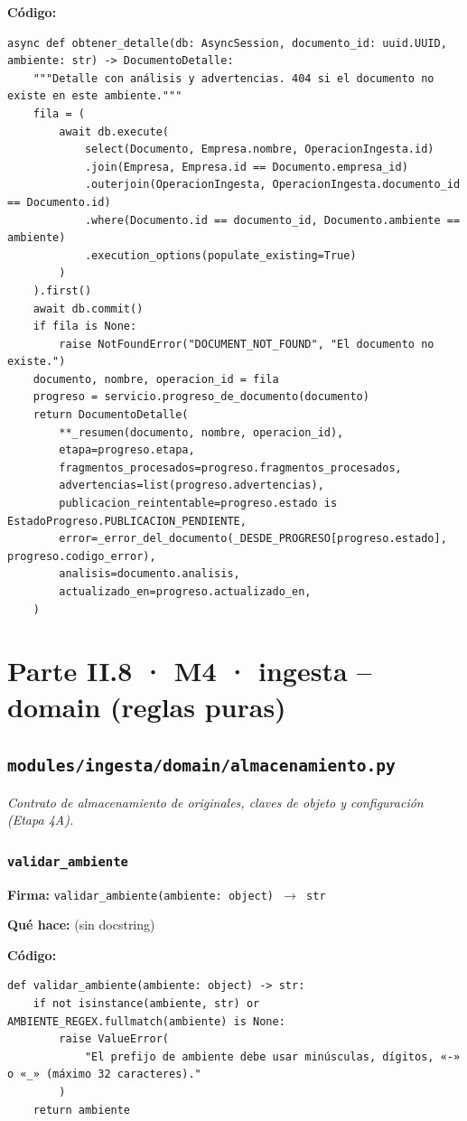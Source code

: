 \documentclass[11pt,a4paper]{article}
\begin{document}
\textbf{Código:}
\begin{lstlisting}
async def obtener_detalle(db: AsyncSession, documento_id: uuid.UUID, ambiente: str) -> DocumentoDetalle:
    """Detalle con análisis y advertencias. 404 si el documento no existe en este ambiente."""
    fila = (
        await db.execute(
            select(Documento, Empresa.nombre, OperacionIngesta.id)
            .join(Empresa, Empresa.id == Documento.empresa_id)
            .outerjoin(OperacionIngesta, OperacionIngesta.documento_id == Documento.id)
            .where(Documento.id == documento_id, Documento.ambiente == ambiente)
            .execution_options(populate_existing=True)
        )
    ).first()
    await db.commit()
    if fila is None:
        raise NotFoundError("DOCUMENT_NOT_FOUND", "El documento no existe.")
    documento, nombre, operacion_id = fila
    progreso = servicio.progreso_de_documento(documento)
    return DocumentoDetalle(
        **_resumen(documento, nombre, operacion_id),
        etapa=progreso.etapa,
        fragmentos_procesados=progreso.fragmentos_procesados,
        advertencias=list(progreso.advertencias),
        publicacion_reintentable=progreso.estado is EstadoProgreso.PUBLICACION_PENDIENTE,
        error=_error_del_documento(_DESDE_PROGRESO[progreso.estado], progreso.codigo_error),
        analisis=documento.analisis,
        actualizado_en=progreso.actualizado_en,
    )
\end{lstlisting}

\section{Parte II.8 · M4 · ingesta -- domain (reglas puras)}
\subsection{\texttt{modules/ingesta/domain/almacenamiento.py}}
\textit{Contrato de almacenamiento de originales, claves de objeto y configuración (Etapa 4A).}

\subsubsection*{\texttt{validar\_ambiente}}
\textbf{Firma:} \texttt{validar\_ambiente(ambiente: object) $\rightarrow$ str}

\textbf{Qué hace:} (sin docstring)

\textbf{Código:}
\begin{lstlisting}
def validar_ambiente(ambiente: object) -> str:
    if not isinstance(ambiente, str) or AMBIENTE_REGEX.fullmatch(ambiente) is None:
        raise ValueError(
            "El prefijo de ambiente debe usar minúsculas, dígitos, «-» o «_» (máximo 32 caracteres)."
        )
    return ambiente
\end{lstlisting}
\end{document}

